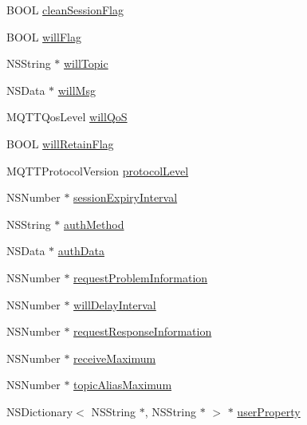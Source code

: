 \begin{DoxyCompactItemize}
\item 
B\+O\+OL \hyperlink{interface_m_q_t_t_session_a8efd9a5bcf99786f2c78d4bc957fa4aa}{clean\+Session\+Flag}
\item 
B\+O\+OL \hyperlink{interface_m_q_t_t_session_aa3227d1cd407e13f1dd694cb352951d7}{will\+Flag}
\item 
N\+S\+String $\ast$ \hyperlink{interface_m_q_t_t_session_a20fd768170dd1d21800420f376d04042}{will\+Topic}
\item 
N\+S\+Data $\ast$ \hyperlink{interface_m_q_t_t_session_a10be0166d86c90591c40b79923eba9ba}{will\+Msg}
\item 
M\+Q\+T\+T\+Qos\+Level \hyperlink{interface_m_q_t_t_session_af9cee4ec8306915190b101441f673a71}{will\+QoS}
\item 
B\+O\+OL \hyperlink{interface_m_q_t_t_session_a54df13cee1ccaa0bf803304c33a3b237}{will\+Retain\+Flag}
\item 
M\+Q\+T\+T\+Protocol\+Version \hyperlink{interface_m_q_t_t_session_a12e20758c5f8a1f0f2bd7dac339fe88f}{protocol\+Level}
\item 
N\+S\+Number $\ast$ \hyperlink{interface_m_q_t_t_session_a03173ce5c561ad884fd4c3c86b893f54}{session\+Expiry\+Interval}
\item 
N\+S\+String $\ast$ \hyperlink{interface_m_q_t_t_session_a66319af49757a922a90fe0ad96ab9fac}{auth\+Method}
\item 
N\+S\+Data $\ast$ \hyperlink{interface_m_q_t_t_session_a79dde69bcc1d7dbd56a30affeb994c20}{auth\+Data}
\item 
N\+S\+Number $\ast$ \hyperlink{interface_m_q_t_t_session_ad8d55fb716b76724ffa009197dcf85f0}{request\+Problem\+Information}
\item 
N\+S\+Number $\ast$ \hyperlink{interface_m_q_t_t_session_ad4fb8060a057777d053aec803097c10a}{will\+Delay\+Interval}
\item 
N\+S\+Number $\ast$ \hyperlink{interface_m_q_t_t_session_a590a46485d04ce0d94740fe9f2957627}{request\+Response\+Information}
\item 
N\+S\+Number $\ast$ \hyperlink{interface_m_q_t_t_session_a7b44b48ef732f87b41c5f9e7082ccc7a}{receive\+Maximum}
\item 
N\+S\+Number $\ast$ \hyperlink{interface_m_q_t_t_session_a4cd7f476fc8c6e86927afa8fad70b820}{topic\+Alias\+Maximum}
\item 
N\+S\+Dictionary$<$ N\+S\+String $\ast$, N\+S\+String $\ast$ $>$ $\ast$ \hyperlink{interface_m_q_t_t_session_aa9f5d1f4c1ced1fd857b60e1f6888f42}{user\+Property}
\item 

\end{DoxyCompactItemize}
